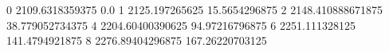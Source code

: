 0 2109.6318359375 0.0
1 2125.197265625 15.5654296875
2 2148.410888671875 38.779052734375
4 2204.60400390625 94.97216796875
6 2251.111328125 141.4794921875
8 2276.89404296875 167.26220703125
